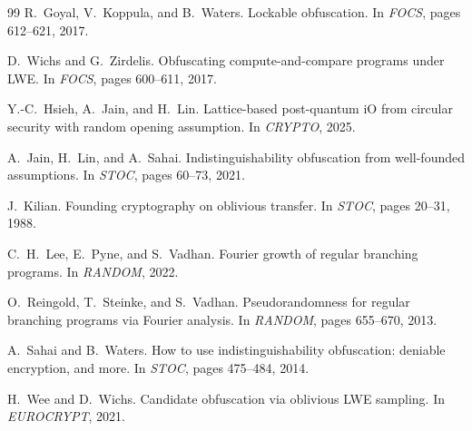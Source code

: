 \documentclass[11pt]{article}
\begin{document}
\begin{thebibliography}{99}
R.~Goyal, V.~Koppula, and B.~Waters.
\newblock Lockable obfuscation.
\newblock In \emph{FOCS}, pages 612--621, 2017.

D.~Wichs and G.~Zirdelis.
\newblock Obfuscating compute-and-compare programs under LWE.
\newblock In \emph{FOCS}, pages 600--611, 2017.

Y.-C.~Hsieh, A.~Jain, and H.~Lin.
\newblock Lattice-based post-quantum iO from circular security with random
  opening assumption.
\newblock In \emph{CRYPTO}, 2025.

A.~Jain, H.~Lin, and A.~Sahai.
\newblock Indistinguishability obfuscation from well-founded assumptions.
\newblock In \emph{STOC}, pages 60--73, 2021.

J.~Kilian.
\newblock Founding cryptography on oblivious transfer.
\newblock In \emph{STOC}, pages 20--31, 1988.

C.~H.~Lee, E.~Pyne, and S.~Vadhan.
\newblock Fourier growth of regular branching programs.
\newblock In \emph{RANDOM}, 2022.

O.~Reingold, T.~Steinke, and S.~Vadhan.
\newblock Pseudorandomness for regular branching programs via Fourier analysis.
\newblock In \emph{RANDOM}, pages 655--670, 2013.

A.~Sahai and B.~Waters.
\newblock How to use indistinguishability obfuscation: deniable encryption, and
  more.
\newblock In \emph{STOC}, pages 475--484, 2014.

H.~Wee and D.~Wichs.
\newblock Candidate obfuscation via oblivious LWE sampling.
\newblock In \emph{EUROCRYPT}, 2021.

\end{thebibliography}
\end{document}
